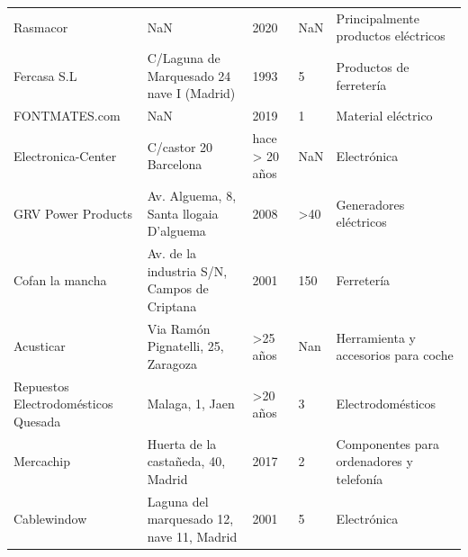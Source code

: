 \begin{tabularx}{\linewidth}{|C{3cm}|Y|Y|Y|Y|}
\hline
{} &  &  &  &  \\
\hline
	Rasmacor & NaN & 2020 & NaN  &  Principalmente productos eléctricos\\
\hline
	Fercasa S.L & C/Laguna de Marquesado 24 nave I (Madrid) & 1993 & 5 & Productos de ferretería \\
\hline
	FONTMATES.com & NaN & 2019 & 1 &  Material eléctrico\\
\hline
	Electronica-Center &  C/castor 20  Barcelona & hace > 20 años & NaN & Electrónica \\
\hline
	GRV Power Products & Av. Alguema, 8, Santa llogaia D'alguema & 2008 & >40 & Generadores eléctricos \\
\hline
	Cofan la mancha & Av. de la industria S/N, Campos de Criptana  & 2001 & 150 & Ferretería \\
\hline
	Acusticar & Via Ramón Pignatelli, 25, Zaragoza  & >25 años  & Nan  & Herramienta y accesorios para coche\\
\hline
	Repuestos Electrodomésticos Quesada & Malaga, 1, Jaen & >20 años & 3 &  Electrodomésticos \\
\hline
	Mercachip & Huerta de la castañeda, 40, Madrid & 2017  & 2 &  Componentes para ordenadores y telefonía \\
\hline
	Cablewindow & Laguna del marquesado 12, nave 11, Madrid  & 2001 & 5 & Electrónica \\
\hline
\end{tabularx}


